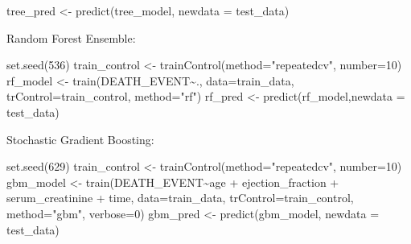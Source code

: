 \documentclass[
]{article}
\newenvironment{Shaded}{\begin{snugshade}}{\end{snugshade}}
\newcommand{\AttributeTok}[1]{\textcolor[rgb]{0.77,0.63,0.00}{#1}}
\newcommand{\DecValTok}[1]{\textcolor[rgb]{0.00,0.00,0.81}{#1}}
\newcommand{\FunctionTok}[1]{\textcolor[rgb]{0.00,0.00,0.00}{#1}}
\newcommand{\NormalTok}[1]{#1}
\newcommand{\OtherTok}[1]{\textcolor[rgb]{0.56,0.35,0.01}{#1}}
\newcommand{\SpecialCharTok}[1]{\textcolor[rgb]{0.00,0.00,0.00}{#1}}
\newcommand{\StringTok}[1]{\textcolor[rgb]{0.31,0.60,0.02}{#1}}
\begin{document}
\begin{Shaded}
\begin{Highlighting}[]
\NormalTok{tree\_pred }\OtherTok{\textless{}{-}} \FunctionTok{predict}\NormalTok{(tree\_model, }\AttributeTok{newdata =}\NormalTok{ test\_data)}
\end{Highlighting}
\end{Shaded}

Random Forest Ensemble:

\begin{Shaded}
\begin{Highlighting}[]
\FunctionTok{set.seed}\NormalTok{(}\DecValTok{536}\NormalTok{)}
\NormalTok{train\_control }\OtherTok{\textless{}{-}} \FunctionTok{trainControl}\NormalTok{(}\AttributeTok{method=}\StringTok{"repeatedcv"}\NormalTok{, }\AttributeTok{number=}\DecValTok{10}\NormalTok{)}
\NormalTok{rf\_model }\OtherTok{\textless{}{-}} \FunctionTok{train}\NormalTok{(DEATH\_EVENT}\SpecialCharTok{\textasciitilde{}}\NormalTok{., }\AttributeTok{data=}\NormalTok{train\_data, }\AttributeTok{trControl=}\NormalTok{train\_control, }\AttributeTok{method=}\StringTok{"rf"}\NormalTok{)}
\NormalTok{rf\_pred }\OtherTok{\textless{}{-}} \FunctionTok{predict}\NormalTok{(rf\_model,}\AttributeTok{newdata =}\NormalTok{ test\_data)}
\end{Highlighting}
\end{Shaded}

Stochastic Gradient Boosting:

\begin{Shaded}
\begin{Highlighting}[]
\FunctionTok{set.seed}\NormalTok{(}\DecValTok{629}\NormalTok{)}
\NormalTok{train\_control }\OtherTok{\textless{}{-}} \FunctionTok{trainControl}\NormalTok{(}\AttributeTok{method=}\StringTok{"repeatedcv"}\NormalTok{, }\AttributeTok{number=}\DecValTok{10}\NormalTok{)}
\NormalTok{gbm\_model }\OtherTok{\textless{}{-}} \FunctionTok{train}\NormalTok{(DEATH\_EVENT}\SpecialCharTok{\textasciitilde{}}\NormalTok{age }\SpecialCharTok{+}\NormalTok{ ejection\_fraction }\SpecialCharTok{+}\NormalTok{ serum\_creatinine }\SpecialCharTok{+}\NormalTok{ time, }\AttributeTok{data=}\NormalTok{train\_data, }\AttributeTok{trControl=}\NormalTok{train\_control, }\AttributeTok{method=}\StringTok{"gbm"}\NormalTok{, }\AttributeTok{verbose=}\DecValTok{0}\NormalTok{)}
\NormalTok{gbm\_pred }\OtherTok{\textless{}{-}} \FunctionTok{predict}\NormalTok{(gbm\_model, }\AttributeTok{newdata =}\NormalTok{ test\_data)}
\end{Highlighting}
\end{Shaded}
\end{document}

